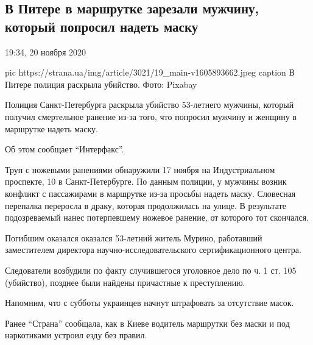  
 
 
 
 

\subsection{В Питере в маршрутке зарезали мужчину, который попросил надеть маску}
\label{sec:20_11_2020.news.ua.strana.2.piter_parshrutka_maska}

\label{sec:20_11_2020.news.ua.strana.2.piter_parshrutka_maska}

19:34, 20 ноября 2020 

\ifcmt
pic https://strana.ua/img/article/3021/19_main-v1605893662.jpeg
caption В Питере полиция раскрыла убийство. Фото: Pixabay 
\fi

Полиция Санкт-Петербурга раскрыла убийство 53-летнего мужчины, который получил
смертельное ранение из-за того, что попросил мужчину и женщину в маршрутке
надеть маску.

Об этом сообщает \enquote{Интерфакс}.

Труп с ножевыми ранениями обнаружили 17 ноября на Индустриальном проспекте, 10
в Санкт-Петербурге. По данным полиции, у мужчины возник конфликт с пассажирами
в маршрутке из-за просьбы надеть маску. Словесная перепалка переросла в драку,
которая продолжилась на улице. В результате подозреваемый нанес потерпевшему
ножевое ранение, от которого тот скончался.

Погибшим оказался оказался 53-летний житель Мурино, работавший заместителем
директора научно-исследовательского сертификационного центра.

Следователи возбудили по факту случившегося уголовное дело по ч. 1 ст. 105
(убийство), позднее были найдены причастные к преступлению.

Напомним, что с субботы украинцев начнут штрафовать за отсутствие масок.

Ранее \enquote{Страна} сообщала, как в Киеве водитель маршрутки без маски и под
наркотиками устроил езду без правил.
